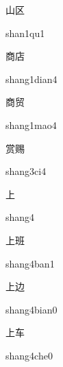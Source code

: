 \begin{multicols*}{2}
\begin{verbete}[shan1qu1]{山区}
\begin{pronuncia}{shan1qu1}
\end{pronuncia}
\end{verbete}

\begin{verbete}{商店}
\begin{pronuncia}{shang1dian4}
\end{pronuncia}
\end{verbete}

\begin{verbete}{商贸}
\begin{pronuncia}{shang1mao4}
\end{pronuncia}
\end{verbete}

\begin{verbete}[shang3ci4]{赏赐}
\begin{pronuncia}{shang3ci4}
\end{pronuncia}
\end{verbete}

\begin{verbete}[shang4]{上}
\begin{pronuncia}{shang4}
\end{pronuncia}
\end{verbete}

\begin{verbete}{上班}
\begin{pronuncia}{shang4ban1}
\end{pronuncia}
\end{verbete}

\begin{verbete}{上边}
\begin{pronuncia}{shang4bian0}
\end{pronuncia}
\end{verbete}

\begin{verbete}{上车}
\begin{pronuncia}{shang4che0}
\end{pronuncia}
\end{verbete}


\end{multicols*}
